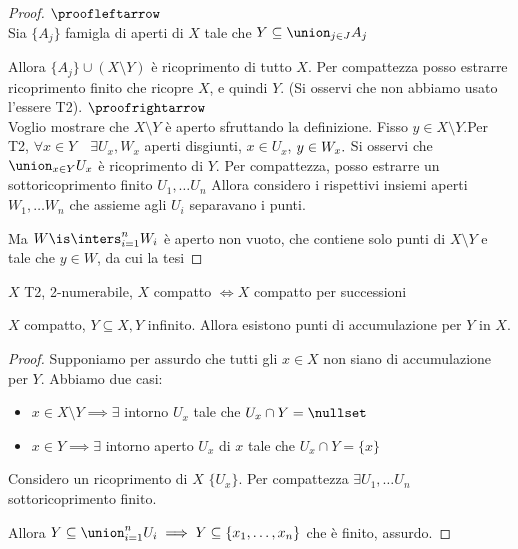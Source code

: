 \begin{proof}
 $\\\proofleftarrow$\\
 Sia $ \{ A_j  \}$ famigla di aperti di $X$ tale che $Y\subseteq \union_{j\in J}A_j$
 
 Allora $ \{ A_j  \} \cup (X\setminus Y)$ è ricoprimento di tutto $X$.
 Per compattezza posso estrarre ricoprimento finito che ricopre $X$, e quindi $Y$. (Si osservi che non abbiamo usato l'essere T2).
 $\\\proofrightarrow$\\
 Voglio mostrare che $X\setminus Y$ è aperto sfruttando la definizione.
 Fisso $y\in X\setminus Y$.Per T2, $\forall x\in Y\quad \exists U_x, W_x$ aperti disgiunti, $x\in U_x$, $y\in W_x.\\$ 
 Si osservi che $\union_{x\in Y}U_x$ è ricoprimento di $Y$. Per compattezza, posso estrarre un sottoricoprimento finito $U_1,\dots U_n$
 Allora considero i rispettivi insiemi aperti $W_1,\dots W_n$ che assieme agli $U_i$ separavano i punti.
  
 Ma $W\is \inters_{i=1}^nW_i$ è aperto non vuoto, che contiene solo punti di $X\setminus Y$ e tale che $y\in W$, da cui la tesi  
 \end{proof}
\begin{prop}
 $X$ T2, 2-numerabile, $ X$ compatto $\iff X$ compatto per successioni
\end{prop}
 \begin{lemma}
  $X$ compatto, $Y\subseteq X, Y$ infinito. Allora esistono punti di accumulazione per $Y$ in $X$.
 \end{lemma}
 \begin{proof}
  Supponiamo per assurdo che tutti gli $x\in X$ non siano di accumulazione per $Y$. Abbiamo due casi:
	\begin{itemize}
	 \item $x\in X\setminus Y\implies \exists$ intorno $U_x$ tale che $U_x\cap Y = \nullset$
	 \item $x\in Y\implies \exists$ intorno aperto $U_x$ di $x$ tale che $U_x\cap Y = \{ x \}$
	\end{itemize}
  Considero un ricoprimento di $X$ $\{ U_x \}$. Per compattezza $\exists U_1,\dots U_n$ sottoricoprimento finito.
  
  Allora $Y\subseteq \union_{i=1}^nU_i\implies Y\subseteq \left \{ x_1,\dots,x_n\right \}$ che è finito, assurdo.
 \end{proof}







